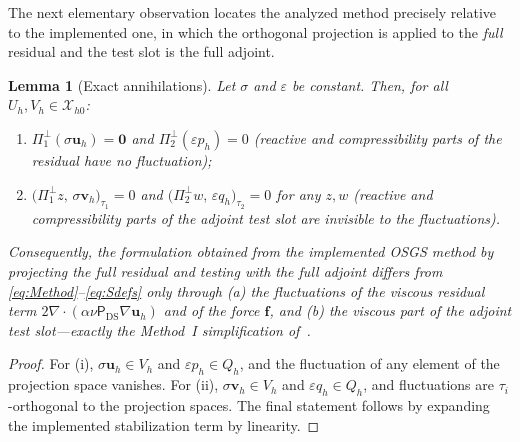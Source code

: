 \documentclass[11pt]{article}
\newtheorem{lemma}[theorem]{Lemma}
\theoremstyle{remark}
\newcommand{\bu}{\boldsymbol{u}}
\newcommand{\bv}{\boldsymbol{v}}
\newcommand{\bff}{\boldsymbol{f}}
\newcommand{\ViscProj}{\mathsf{P}_{\mathrm{DS}}}
\newcommand{\Poneo}{\Pi_{1}^{\perp}}
\newcommand{\Ptwoo}{\Pi_{2}^{\perp}}
\newcommand{\Xhz}{\mathcal{X}_{h0}}
\begin{document}
The next elementary observation locates the analyzed method precisely relative to the
implemented one, in which the orthogonal projection is applied to the \emph{full}
residual and the test slot is the full adjoint.

\begin{lemma}[Exact annihilations]
\label{lem:annihilation}
Let $\sigma$ and $\varepsilon$ be constant. Then, for all $U_h, V_h \in \Xhz$:
\begin{enumerate}[label=\textup{(\roman*)}, itemsep=0.2ex]
  \item $\Poneo(\sigma\bu_h) = \boldsymbol{0}$ and $\Ptwoo(\varepsilon p_h) = 0$
        (reactive and compressibility parts of the residual have no fluctuation);
  \item $\bigl( \Poneo z,\, \sigma\bv_h \bigr)_{\tau_1} = 0$ and
        $\bigl( \Ptwoo w,\, \varepsilon q_h \bigr)_{\tau_2} = 0$ for any $z, w$
        (reactive and compressibility parts of the adjoint test slot are invisible to
        the fluctuations).
\end{enumerate}
Consequently, the formulation obtained from the implemented OSGS method by projecting
the full residual and testing with the full adjoint differs from
\cref{eq:Method}--\cref{eq:Sdefs} only through (a) the fluctuations of the viscous
residual term $2\nabla\cdot(\alpha\nu\ViscProj\nabla\bu_h)$ and of the force $\bff$,
and (b) the viscous part of the adjoint test slot---exactly the Method~I
simplification of~\cite{Codina2008}.
\end{lemma}

\begin{proof}
For (i), $\sigma\bu_h \in V_h$ and $\varepsilon p_h \in Q_h$, and the fluctuation of
any element of the projection space vanishes. For (ii), $\sigma\bv_h \in V_h$ and
$\varepsilon q_h \in Q_h$, and fluctuations are $\tau_i$-orthogonal to the projection
spaces. The final statement follows by expanding the implemented stabilization
term by linearity.
\end{proof}
\end{document}
